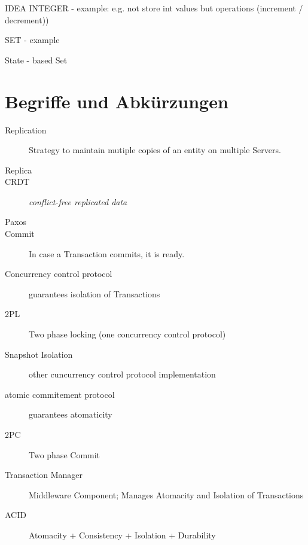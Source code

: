 \documentclass[a4paper,12pt]{article}%
\begin{document}
IDEA
INTEGER  - example: 
e.g. not store int values but operations (increment / decrement))

SET - example

State - based Set


\section{Begriffe und Abkürzungen}

\begin{description}
	\item[Replication] Strategy to maintain mutiple copies of an entity on multiple Servers.
	\item[Replica] 
	\item[CRDT] {\it conflict-free replicated data}
	\item[Paxos] 
	\item[Commit] In case a Transaction commits, it is ready.
	\item[Concurrency control protocol] guarantees isolation of Transactions
	\item[2PL] Two phase locking (one concurrency control protocol)
	\item[Snapshot Isolation] other cuncurrency control protocol implementation
	\item[atomic commitement protocol] guarantees atomaticity
	\item[2PC] Two phase Commit
	\item[Transaction Manager] Middleware Component; Manages Atomacity and Isolation of Transactions
	\item[ACID]  Atomacity + Consistency + Isolation + Durability
\end{description}
\end{document}
